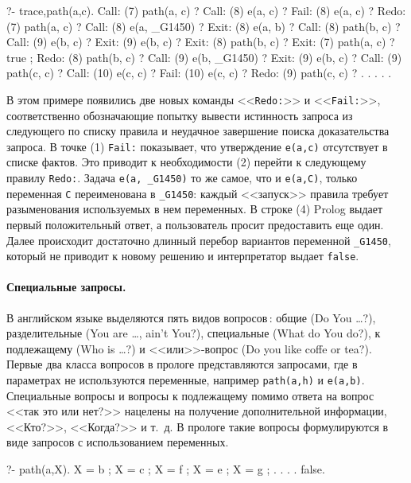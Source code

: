 \documentclass[a4paper,14pt, openany, twoside, draft]{extbook} %
\begin{document}
\begin{proexp}
?- trace,path(a,c).
   Call: (7) path(a, c) ?
   Call: (8) e(a, c) ?
   Fail: (8) e(a, c) ?        %
   Redo: (7) path(a, c) ?     %
   Call: (8) e(a, _G1450) ?   %
   Exit: (8) e(a, b) ?
   Call: (8) path(b, c) ?
   Call: (9) e(b, c) ?
   Exit: (9) e(b, c) ?
   Exit: (8) path(b, c) ?
   Exit: (7) path(a, c) ?
true ;                        %
   Redo: (8) path(b, c) ?
   Call: (9) e(b, _G1450) ?
   Exit: (9) e(b, c) ?
   Call: (9) path(c, c) ?
   Call: (10) e(c, c) ?
   Fail: (10) e(c, c) ?
   Redo: (9) path(c, c) ?     %
   . . . . .
\end{proexp}


В этом примере появились две новых команды <<\texttt{Redo:}>> и <<\texttt{Fail:}>>, соответственно обозначающие попытку вывести истинность запроса из следующего по списку правила и неудачное завершение поиска доказательства запроса.  В точке (1) \texttt{Fail:} показывает, что утверждение \texttt{e(a,c)} отсутствует в списке фактов.  Это приводит к необходимости (2) перейти к следующему правилу \texttt{Redo:}.  Задача \texttt{e(a, \_G1450)} то же самое, что и \texttt{e(a,C)}, только переменная \texttt{C} переименована в \texttt{\_G1450}: каждый <<запуск>> правила требует разыменования используемых в нем переменных.  В строке (4) Prolog выдает первый положительный ответ, а пользователь просит предоставить еще один.  Далее происходит достаточно длинный перебор вариантов переменной \texttt{\_G1450}, который не приводит к новому решению и интерпретатор выдает \texttt{false}.

\paragraph{Специальные запросы.} В английском языке выделяются пять видов вопросов\,: общие (Do You \ldots{}?), разделительные (You are \ldots{}, ain't You?), специальные (What do You do?), к подлежащему (Who is \ldots{}?) и <<или>>-вопрос (Do you like coffe or tea?).  Первые два класса вопросов в прологе представляются запросами, где в параметрах не используются переменные, например \texttt{path(a,h)} и \texttt{e(a,b)}.  Специальные вопросы и вопросы к подлежащему помимо ответа на вопрос <<так это или нет?>> нацелены на получение дополнительной информации, <<Кто?>>, <<Когда?>> и т.~д.  В прологе такие вопросы формулируются в виде запросов с использованием переменных.

\begin{proexp}
?- path(a,X).
X = b ;
X = c ;
X = f ;
X = e ;
X = g ;
. . . .
false.
\end{proexp}
\end{document}
